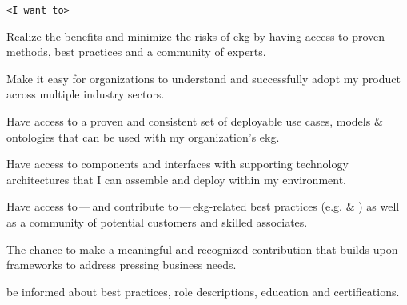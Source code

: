 \begin{description}[font=\bfseries,leftmargin=!,labelwidth=\widthof{\bfseries Technical Architect}]
    \item[\texttt{<as a>}]      \texttt{<I want to>}
    \item[Business Executive]   Realize the benefits and minimize the risks of \gls{ekg} by having access to
                                proven methods, best practices and a community of experts.
    \item[Vendor]               Make it easy for organizations to understand and successfully adopt my product across
                                multiple industry sectors.
    \item[Modeler]              Have access to a proven and consistent set of deployable use cases,
                                models \& ontologies that can be used with my organization’s \gls{ekg}.
    \item[Technical Architect]  Have access to components and interfaces with supporting technology architectures
                                that I can assemble and deploy within my environment.
    \item[Consultant]           Have access to\,---\,and contribute to\,---\,\gls{ekg}-related best practices
                                (e.g.  \& ) as well as a community of
                                potential customers and skilled associates.
    \item[Academic]             The chance to make a meaningful and recognized contribution that builds upon
                                frameworks to address pressing business needs.
    \item[\glsxtrshort{ekg} Engineer] be informed about best practices, role descriptions, education and certifications.
\end{description}
